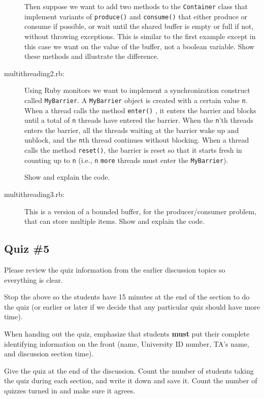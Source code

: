 \documentclass[12pt]{article}
\begin{document}
\begin{description}
              Then suppose we want to add two methods to the
              \texttt{Container} class that implement variants of
              \texttt{produce()} and \texttt{consume()} that either produce
              or consume if possible, or wait until the shared buffer is
              empty or full if not, without throwing exceptions.  This is
              similar to the first example except in this case we want on
              the value of the buffer, not a boolean variable.  Show these
              methods and illustrate the difference.


        \item[multithreading2.rb:] Using Ruby monitors we want to implement
              a synchronization construct called \texttt{MyBarrier}.  A
              \texttt{MyBarrier} object is created with a certain value
              \texttt{n}.  When a thread calls the method \texttt{enter()} ,
              it enters the barrier and blocks until a total of \texttt{n}
              threads have entered the barrier.  When the \texttt{n}'th
              threads enters the barrier, all the threads waiting at the
              barrier wake up and unblock, and the \texttt{n}th thread
              continues without blocking.  When a thread calls the method
              \texttt{reset()}, the barrier is reset so that it starts fresh
              in counting up to \texttt{n} (i.e., \texttt{n} \texttt{more}
              threads must enter the \texttt{MyBarrier}).

              Show and explain the code.

        \item[multithreading3.rb:] This is a version of a bounded buffer, for
              the producer/consumer problem, that can store multiple items.
              Show and explain the code.

      \end{description}

      \vspace{-1.5mm}

    \subsection{Quiz \#5}

      Please review the quiz information from the earlier discussion topics
    so everything is clear.

      Stop the above so the students have 15 minutes at the end of the section
    to do the quiz (or earlier or later if we decide that any particular
    quiz should have more time).

      When handing out the quiz, emphasize that students \textbf{must} put
    their complete identifying information on the front (name, University ID
    number, TA's name, and discussion section time).

      Give the quiz at the end of the discussion.  Count the number of
    students taking the quiz during each section, and write it down and save
    it.  Count the number of quizzes turned in and make sure it agrees.
\end{document}
